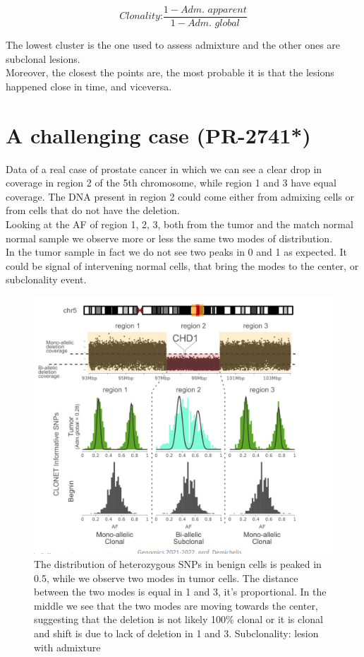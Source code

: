 \begin{equation}
\textit{Clonality:} \frac{1 - \textit{Adm. apparent}}{1 - \textit{Adm. global}}
\end{equation}

The lowest cluster is the one used to assess admixture and the other ones are subclonal lesions.\\
Moreover, the closest the points are, the most probable it is that the lesions happened close in time, and viceversa.

\section{A challenging case (PR-2741*)}
Data of a real case of prostate cancer in which we can see a clear drop in coverage in region 2 of the 5th chromosome, while region 1 and 3 have equal coverage. The DNA present in region 2 could come either from admixing cells or from cells that do not have the deletion. \\
Looking at the AF of region 1, 2, 3, both from the tumor and the match normal normal sample we observe more or less the same two modes of distribution.\\
In the tumor sample in fact we do not see two peaks in 0 and 1 as expected. It could be signal of intervening normal cells, that bring the modes to the center, or subclonality event. \\


\begin{figure}
	\centering
	\includegraphics[width=0.7\linewidth]{PR_2741.png}
	\caption{ The distribution of heterozygous SNPs in benign cells is peaked in 0.5, while we observe two modes in tumor cells. The distance between the two modes is equal in 1 and 3, it’s proportional. In the middle we see that the two modes are moving towards the center, suggesting that the deletion is not likely 100\% clonal or it is clonal and shift is due to lack of deletion in 1 and 3. Subclonality: lesion with admixture}
	\label{fig:adm}
	\end{figure}
